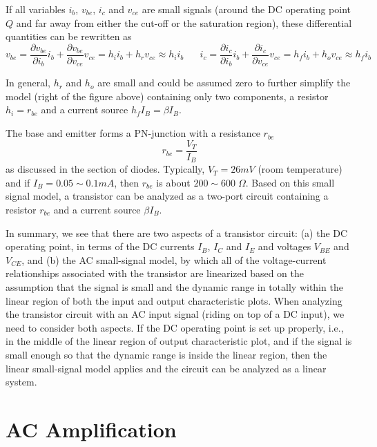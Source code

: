If all variables $i_b$, $v_{be}$, $i_c$ and $v_{ce}$ are small signals (around 
the DC operating point $Q$ and far away from either the cut-off or the saturation 
region), these differential quantities can be rewritten as 
\[
	v_{be}=\frac{\partial v_{be}}{\partial i_b}
	i_b+\frac{\partial v_{be}}{\partial v_{ce}} v_{ce}=h_i i_b+h_r v_{ce}	
	\approx h_i i_b
	\;\;\;\;\;\;
	i_c=\frac{\partial i_c}{\partial i_b} i_b
	+\frac{\partial i_c}{\partial v_{ce}} v_{ce}=h_f i_b+h_o v_{ce}
	\approx h_f i_b
\]



In general, $h_r$ and $h_o$ are small and could be assumed zero to further 
simplify the model (right of the figure above) containing only two components, 
a resistor $h_i=r_{be}$ and a current source $h_f I_B=\beta I_B$.

The base and emitter forms a PN-junction with a resistance $r_{be}$ 
\[	
r_{be}=\frac{V_T}{I_B}	
\]
as discussed in the section of diodes. Typically, $V_T=26 mV$ (room temperature)
and if $I_B=0.05 \sim 0.1 mA$, then $r_{be}$ is about $200 \sim 600\;\Omega$.
Based on this small signal model, a transistor can be analyzed as a two-port 
circuit containing a resistor $r_{be}$ and a current source $\beta I_B$.

In summary, we see that there are two aspects of a transistor circuit: (a) the
DC operating point, in terms of the DC currents $I_B$, $I_C$ and $I_E$ and 
voltages $V_{BE}$ and $V_{CE}$, and (b) the AC small-signal model, by which all 
of the voltage-current relationships associated with the transistor are linearized
based on the assumption that the signal is small and the dynamic range in totally
within the linear region of both the input and output characteristic plots. When
analyzing the transistor circuit with an AC input signal (riding on top of a DC 
input), we need to consider both aspects. If the DC operating point is set up 
properly, i.e., in the middle of the linear region of output characteristic
plot, and if the signal is small enough so that the dynamic range is inside 
the linear region, then the linear small-signal model applies and the circuit
can be analyzed as a linear system.


\section*{AC Amplification}


